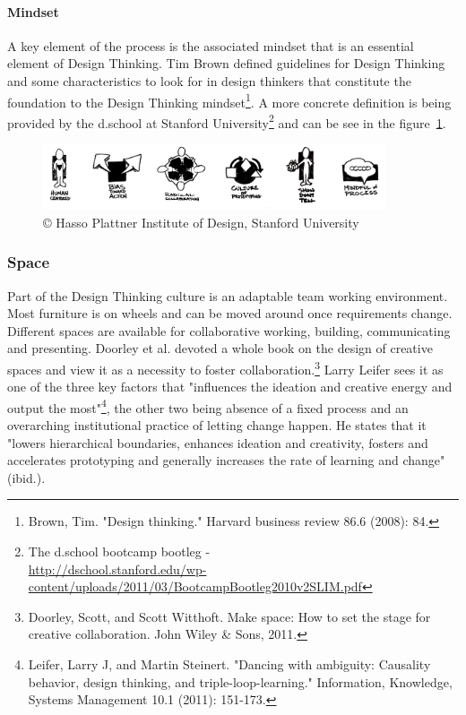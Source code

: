 \paragraph*{Mindset}

A key element of the process is the associated mindset that is an essential element of Design Thinking. Tim Brown defined guidelines for Design Thinking and some characteristics to look for in design thinkers that constitute the foundation to the Design Thinking mindset\footnote{Brown, Tim. "Design thinking." Harvard business review 86.6 (2008): 84.}. A more concrete definition is being provided by the d.school at Stanford University\footnote{The d.school bootcamp bootleg - \\\url{http://dschool.stanford.edu/wp-content/uploads/2011/03/BootcampBootleg2010v2SLIM.pdf}} and can be see in the figure~\ref{fig:d_mindset}.

\begin{figure}
  \centering
    \includegraphics[width=0.9\textwidth]{Figures/ChapterContext/d_mindset}
  \caption[The Mindset of Design-Thinking]{© Hasso Plattner Institute of Design, Stanford University}
  \label{fig:d_mindset}
\end{figure}

\subsubsection{Space}

Part of the Design Thinking culture is an adaptable team working environment. Most furniture is on wheels and can be moved around once requirements change. Different spaces are available for collaborative working, building, communicating and presenting. Doorley et al. devoted a whole book on the design of creative spaces and view it as a necessity to foster collaboration.\footnote{Doorley, Scott, and Scott Witthoft. Make space: How to set the stage for creative collaboration. John Wiley \& Sons, 2011.}  Larry Leifer sees it as one of the three key factors that "influences the ideation and creative energy and output the most"\footnote{Leifer, Larry J, and Martin Steinert. "Dancing with ambiguity: Causality behavior, design thinking, and triple-loop-learning." Information, Knowledge, Systems Management 10.1 (2011): 151-173.}, the other two being absence of a fixed process and an overarching institutional practice of letting change happen. He states that it "lowers hierarchical boundaries, enhances ideation and creativity, fosters and accelerates prototyping and generally increases the rate of learning and change" (ibid.).


